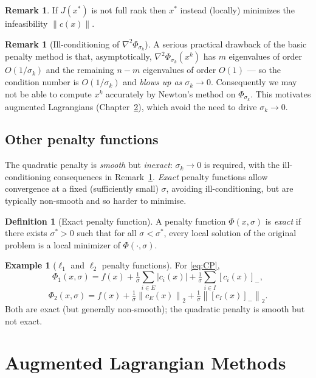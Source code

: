 \documentclass[11pt,a4paper]{report}
\theoremstyle{plain}
\theoremstyle{definition}
\newtheorem{definition}[theorem]{Definition}
\newtheorem{example}[theorem]{Example}
\newtheorem{remark}[theorem]{Remark}
\newcommand{\norm}[1]{\left\lVert#1\right\rVert}
\newcommand{\hess}{\nabla^{2}}
\begin{document}
\begin{remark}
If $J(x^{*})$ is not full rank then $x^{*}$ instead (locally) minimizes the infeasibility $\norm{c(x)}$.
\end{remark}

\begin{remark}[Ill-conditioning of $\hess\Phi_{\sigma_{k}}$]\label{rem:penalty-ill}
A serious practical drawback of the basic penalty method is that, asymptotically,
$\hess\Phi_{\sigma_{k}}(x^{k})$ has $m$ eigenvalues of order $O(1/\sigma_{k})$ and
the remaining $n-m$ eigenvalues of order $O(1)$ — so the condition number is
$O(1/\sigma_{k})$ and \emph{blows up as $\sigma_{k}\to 0$}. Consequently we may
not be able to compute $x^{k}$ accurately by Newton's method on $\Phi_{\sigma_{k}}$.
This motivates augmented Lagrangians (Chapter~\ref{ch:auglag}), which avoid the
need to drive $\sigma_{k}\to 0$.
\end{remark}

\section{Other penalty functions}

The quadratic penalty is \emph{smooth} but \emph{inexact}: $\sigma_{k}\to 0$ is
required, with the ill-conditioning consequences in
Remark~\ref{rem:penalty-ill}. \emph{Exact} penalty functions allow convergence at
a fixed (sufficiently small) $\sigma$, avoiding ill-conditioning, but are
typically non-smooth and so harder to minimise.

\begin{definition}[Exact penalty function]
A penalty function $\Phi(x,\sigma)$ is \emph{exact} if there exists $\sigma^{*}>0$
such that for all $\sigma<\sigma^{*}$, every local solution of the original problem
is a local minimizer of $\Phi(\cdot,\sigma)$.
\end{definition}

\begin{example}[$\ell_{1}$ and $\ell_{2}$ penalty functions]
For \eqref{eq:CP},
\[
\Phi_{1}(x,\sigma)=f(x)+\tfrac{1}{\sigma}\sum_{i\in E}|c_{i}(x)|+\tfrac{1}{\sigma}\sum_{i\in I}[c_{i}(x)]_{-},
\]
\[
\Phi_{2}(x,\sigma)=f(x)+\tfrac{1}{\sigma}\norm{c_{E}(x)}_{2}+\tfrac{1}{\sigma}\norm{[c_{I}(x)]_{-}}_{2}.
\]
Both are exact (but generally non-smooth); the quadratic penalty is smooth but
not exact.
\end{example}


\chapter{Augmented Lagrangian Methods}
\label{ch:auglag}
\end{document}

